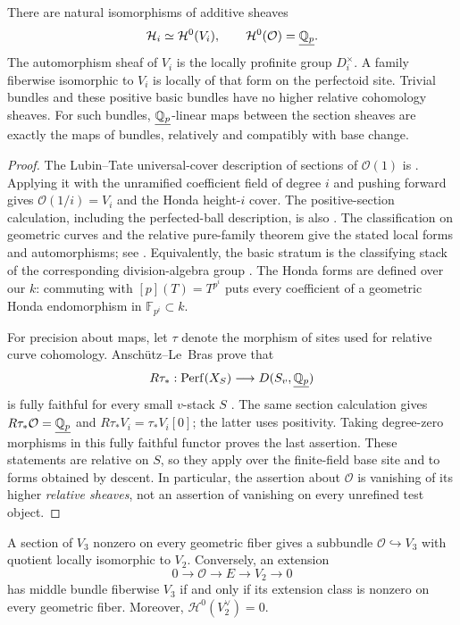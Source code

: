\begin{lemma}
\label{lem:relative-section-facts}
There are natural isomorphisms of additive sheaves
\[
 \mathcal H_i\simeq \mathcal H^0(V_i),\qquad
 \mathcal H^0(\mathcal O)=\underline{\mathbb Q_p}.
\]
The automorphism sheaf of $V_i$ is the locally profinite group
$D_i^\times$.  A family fiberwise isomorphic to $V_i$ is locally
of that form on the perfectoid site.  Trivial bundles and these
positive basic bundles have no higher relative cohomology sheaves.
For such bundles, $\underline{\mathbb Q_p}$-linear maps between the section
sheaves are exactly the maps of bundles, relatively and compatibly
with base change.
\end{lemma}

\begin{proof}
The Lubin--Tate universal-cover description of sections of
$\mathcal O(1)$ is
\cite[Proposition~II.2.2]{FS21}.  Applying it with the unramified
coefficient field of degree $i$ and pushing forward gives
$\mathcal O(1/i)=V_i$ and the Honda height-$i$ cover.
The positive-section calculation, including the perfected-ball
description, is also
\cite[Proposition~II.2.5]{FS21}.
The classification on geometric curves and the relative pure-family
theorem give the stated local forms and automorphisms; see
\cite[Theorems~II.2.14 and II.2.19]{FS21}.
Equivalently, the basic stratum is the classifying stack of the
corresponding division-algebra group
\cite[Theorem~III.4.5]{FS21}.
The Honda forms are defined over our $k$: commuting with
$[p](T)=T^{p^i}$ puts every coefficient of a geometric Honda
endomorphism in $\mathbb F_{p^i}\subset k$.

For precision about maps, let $\tau$ denote the morphism of sites
used for relative curve cohomology.  Ansch\"utz--Le~Bras prove that
\[
 R\tau_*:\operatorname{Perf}(X_S)\longrightarrow
 D(S_v,\underline{\mathbb Q_p})
\]
is fully faithful for every small $v$-stack $S$
\cite[Corollary~3.11]{ALB25}.
The same section calculation gives
$R\tau_*\mathcal O=\underline{\mathbb Q_p}$ and
$R\tau_*V_i=\tau_*V_i[0]$; the latter uses positivity.
Taking degree-zero morphisms in this fully faithful functor proves
the last assertion.  These statements are relative on $S$, so they
apply over the finite-field base site and to forms obtained by
descent.  In particular, the assertion about $\mathcal O$ is
vanishing of its higher \emph{relative sheaves}, not an assertion
of vanishing on every unrefined test object.
\end{proof}

\begin{lemma}
\label{lem:stable-bundle-tests}
A section of $V_3$ nonzero on every geometric fiber gives a
subbundle $\mathcal O\hookrightarrow V_3$ with quotient locally
isomorphic to $V_2$.  Conversely, an extension
\begin{equation}
 0\longrightarrow\mathcal O\longrightarrow E
       \longrightarrow V_2\longrightarrow0
 \label{eq:basic-extension}
\end{equation}
has middle bundle fiberwise $V_3$ if and only if its extension class
is nonzero on every geometric fiber.  Moreover,
$\mathcal H^0(V_2^\vee)=0$.
\end{lemma}

